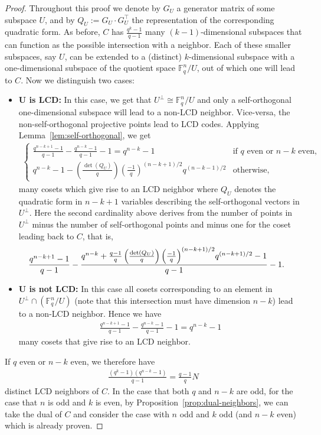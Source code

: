 \documentclass[11pt]{article}
\theoremstyle{definition}
\newcommand{\F}{\mathbb{F}}
\newcommand{\Leg}[2]{\left(\frac{#1}{#2}\right)}                       %
\begin{document}
\begin{proof}
	Throughout this proof we denote by $G_U$ a generator matrix of some subspace $U$, and by $Q_U:=G_U \cdot G_U^\top$ the representation of the corresponding quadratic form.
	As before, $C$ has $\frac{q^k - 1}{q - 1}$ many $(k - 1)$-dimensional subspaces that can function as the possible intersection with a neighbor.
	Each of these smaller subspaces, say $U$, can be extended to a (distinct) $k$-dimensional subspace with a one-dimensional subspace of the quotient space $\F_q^n / U$, out of which one will lead to $C$.
	Now we distinguish two cases:
	\begin{itemize}
		\item \textbf{$\mathbf{U}$ is LCD:}
			In this case, we get that $U^\perp \cong \F_q^n / U$ and only a self-orthogonal one-dimensional subspace will lead to a non-LCD neighbor.
			Vice-versa, the non-self-orthogonal projective points lead to LCD codes.
			Applying Lemma~\ref{lem:self-orthogonal}, we get
			\begin{align*}
				\begin{cases}
						\frac{q^{n - k + 1} - 1}{q - 1}
					  - \frac{q^{n - k} - 1}{q - 1} - 1
					  = q^{n - k} - 1
					  &\text{if $q$ even or $n - k$ even}, \\
						q^{n - k} - 1 - \Leg{\det(Q_U)}{q}
						{\Leg{-1}{q}}^{(n - k + 1) / 2}
						q^{(n - k - 1) / 2}
					  &\text{otherwise},
				   \end{cases}
			\end{align*}
			many cosets which give rise to an LCD neighbor where $Q_U$ denotes the quadratic form in $n - k + 1$ variables describing the self-orthogonal vectors in $U^\perp$.
			Here the second cardinality above derives from the number of points in $U^\perp$ minus the number of self-orthogonal points and minus one for the coset leading back to $C$, that is,
			\begin{align*}
				&\frac{q^{n - k + 1} -1}{q - 1}
				- \frac{%
					q^{n - k} + \frac{q - 1}{q}
					\Leg{\det(Q_U)}{q}
					{\Leg{-1}{q}}^{(n - k + 1)/2}
					q^{(n - k + 1) / 2} - 1
				}{q - 1} - 1.
			\end{align*}
		  \item \textbf{$\mathbf{U}$ is not LCD:}
			In this case all cosets corresponding to an element in $U^\perp \cap (\F_q^n / U)$ (note that this intersection must have dimension $n - k$) lead to a non-LCD neighbor.
			Hence we have
			\begin{align*}
				\frac{q^{n - k + 1} - 1}{q - 1} - \frac{q^{n - k} - 1}{q - 1} - 1
				= q^{n - k} - 1
			\end{align*}
			many cosets that give rise to an LCD neighbor.
	\end{itemize}
	If $q$ even or $n - k$ even, we therefore have
	\begin{align*}
		\frac{(q^k - 1) (q^{n - k} - 1)}{q - 1} = \frac{q - 1}{q} N
	\end{align*}
	distinct LCD neighbors of $C$.
	In the case that both $q$ and $n - k$ are odd, for the case that $n$ is odd and $k$ is even, by Proposition~\ref{prop:dual-neighbors}, we can take the dual of $C$ and consider the case with $n$ odd and $k$ odd (and $n - k$ even) which is already proven.


\end{proof}
\end{document}
